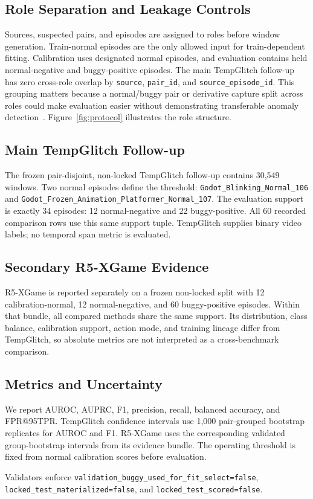 \subsection{Role Separation and Leakage Controls}

Sources, suspected pairs, and episodes are assigned to roles before window generation. Train-normal
episodes are the only allowed input for train-dependent fitting. Calibration uses designated normal
episodes, and evaluation contains held normal-negative and buggy-positive episodes. The main
TempGlitch follow-up has zero cross-role overlap by \texttt{source}, \texttt{pair\_id}, and
\texttt{source\_episode\_id}. This grouping matters because a normal/buggy pair or derivative
capture split across roles could make evaluation easier without demonstrating transferable
anomaly detection~\cite{kaufman2011leakage}. Figure~\ref{fig:protocol} illustrates the
role structure.

\subsection{Main TempGlitch Follow-up}

The frozen pair-disjoint, non-locked TempGlitch follow-up contains 30,549 windows. Two normal
episodes define the threshold:
\texttt{Godot\_Blinking\_Normal\_106} and
\texttt{Godot\_Frozen\_Animation\_Platformer\_Normal\_107}. The evaluation support is exactly 34
episodes: 12 normal-negative and 22 buggy-positive. All 60 recorded comparison rows use this same
support tuple. TempGlitch supplies binary video labels; no temporal span metric is evaluated.

\subsection{Secondary R5-XGame Evidence}

R5-XGame is reported separately on a frozen non-locked split with 12 calibration-normal, 12
normal-negative, and 60 buggy-positive episodes. Within that bundle, all compared methods share
the same support. Its distribution, class balance, calibration support, action mode, and training
lineage differ from TempGlitch, so absolute metrics are not interpreted as a cross-benchmark
comparison.

\subsection{Metrics and Uncertainty}

We report AUROC, AUPRC, F1, precision, recall, balanced accuracy, and FPR@95TPR. TempGlitch
confidence intervals use 1,000 pair-grouped bootstrap replicates for AUROC and F1. R5-XGame uses
the corresponding validated group-bootstrap intervals from its evidence bundle. The operating
threshold is fixed from normal calibration scores before evaluation.

Validators enforce
\texttt{validation\_buggy\_used\_for\_fit\_select=false},
\texttt{locked\_test\_materialized=false}, and
\texttt{locked\_test\_scored=false}.
